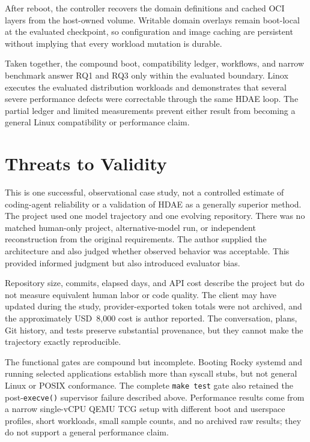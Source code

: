 \documentclass[11pt]{article}
\begin{document}
After reboot, the controller recovers the domain definitions and cached OCI
layers from the host-owned volume. Writable domain overlays remain boot-local
at the evaluated checkpoint, so configuration and image caching are persistent
without implying that every workload mutation is durable.

Taken together, the compound boot, compatibility ledger, workflows, and narrow
benchmark answer RQ1 and RQ3 only within the evaluated boundary. Linox executes
the evaluated distribution workloads and demonstrates that several severe performance
defects were correctable through the same HDAE loop. The partial ledger and
limited measurements prevent either result from becoming a general Linux
compatibility or performance claim.

\section{Threats to Validity}

This is one successful, observational case study, not a controlled estimate of
coding-agent reliability or a validation of HDAE as a generally superior
method. The project used one model trajectory and one evolving repository.
There was no matched human-only project, alternative-model run, or
independent reconstruction from the original requirements. The author supplied
the architecture and also judged whether observed behavior was acceptable. This
provided informed judgment but also introduced evaluator bias.

Repository size, commits, elapsed days, and API cost describe the project but
do not measure equivalent human labor or code quality. The client may have
updated during the study, provider-exported token totals were not archived, and
the approximately USD~8,000 cost is author reported. The conversation, plans,
Git history, and tests preserve substantial provenance, but they cannot make the
trajectory exactly reproducible.

The functional gates are compound but incomplete. Booting Rocky systemd and
running selected applications establish more than syscall stubs, but not
general Linux or POSIX conformance. The complete \texttt{make test} gate also
retained the post-\texttt{execve()} supervisor failure described above.
Performance results come from a narrow single-vCPU QEMU TCG setup with
different boot and userspace profiles, short workloads, small sample counts,
and no archived raw results; they do not support a general performance claim.
\end{document}
